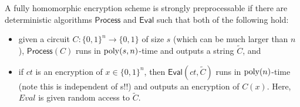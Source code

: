 \documentclass[11pt]{article}
\newcommand{\zo}{\{0,1\}}
\def\Process{\mathsf{Process}}
\def\Eval{\mathsf{Eval}}
\begin{document}
\begin{definition}
    A fully homomorphic encryption scheme is strongly preprocessable if there are deterministic algorithms $\Process$ and $\Eval$ such that both of the following hold: 
\begin{itemize}
    \item given a circuit $C: \zo^n \to \zo$ of size $s$ (which can be much larger than $n$), $\Process(C)$ runs in ${\rm poly}(s,n)$-time and outputs a string $\tilde{C}$, and 
    \item if $ct$ is an encryption of $x \in \zo^n$, then $\Eval(ct, \tilde{C})$ runs in ${\rm poly}(n)$-time (note this is independent of s!!)  and outputs an encryption of $C(x)$. Here, $Eval$ is given random access to $\tilde{C}$.
\end{itemize}
\end{definition}
\end{document}
